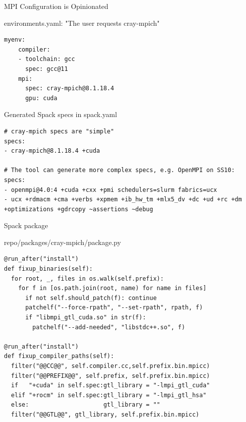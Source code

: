 \documentclass[aspectratio=43]{beamer}
\begin{document}
\begin{frame}[fragile]{MPI Configuration is Opinionated}

\begin{code}{environments.yaml: "The user requests cray-mpich"}
    \begin{lstlisting}[style=talkyaml]
myenv:
    compiler:
    - toolchain: gcc
      spec: gcc@11
    mpi:
      spec: cray-mpich@8.1.18.4
      gpu: cuda \end{lstlisting}
\end{code}

\begin{code}{Generated Spack specs in spack.yaml}
    \begin{lstlisting}[style=talkyaml]
# cray-mpich specs are "simple"
specs:
- cray-mpich@8.1.18.4 +cuda

# The tool can generate more complex specs, e.g. OpenMPI on SS10:
specs:
- openmpi@4.0:4 +cuda +cxx +pmi schedulers=slurm fabrics=ucx
- ucx +rdmacm +cma +verbs +xpmem +ib_hw_tm +mlx5_dv +dc +ud +rc +dm +optimizations +gdrcopy ~assertions ~debug \end{lstlisting}
\end{code}

\end{frame}

\begin{frame}[fragile]{Spack package}

\begin{code}{repo/packages/cray-mpich/package.py}
    \begin{lstlisting}[style=talkbash]
@run_after("install")
def fixup_binaries(self):
  for root, _, files in os.walk(self.prefix):
    for f in [os.path.join(root, name) for name in files]
      if not self.should_patch(f): continue
      patchelf("--force-rpath", "--set-rpath", rpath, f)
      if "libmpi_gtl_cuda.so" in str(f):
        patchelf("--add-needed", "libstdc++.so", f)

@run_after("install")
def fixup_compiler_paths(self):
  filter("@@CC@@", self.compiler.cc,self.prefix.bin.mpicc)
  filter("@@PREFIX@@", self.prefix, self.prefix.bin.mpicc)
  if   "+cuda" in self.spec:gtl_library = "-lmpi_gtl_cuda"
  elif "+rocm" in self.spec:gtl_library = "-lmpi_gtl_hsa"
  else:                     gtl_library = ""
  filter("@@GTL@@", gtl_library, self.prefix.bin.mpicc) \end{lstlisting}
\end{code}

\end{frame}
\end{document}
